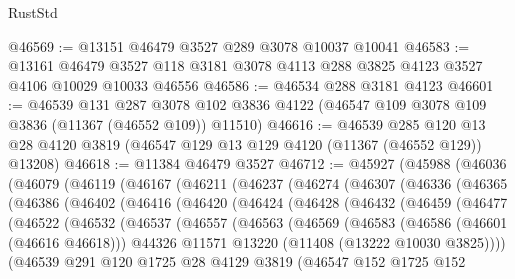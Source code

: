 \begin{lexlean}{RustStd}
\begin{coremodule}
@46569 := @13151 @46479 @3527 @289 @3078 @10037 @10041
@46583 := @13161
    @46479
    @3527
    @118
    @3181
    @3078
    @4113
    @288
    @3825
    @4123
    @3527
    @4106
    @10029
    @10033
    @46556
@46586 := @46534 @288 @3181 @4123
@46601 := @46539
    @131
    @287
    @3078
    @102
    @3836
    @4122
    (@46547 @109 @3078 @109 @3836 (@11367 (@46552 @109)) @11510)
@46616 := @46539
    @285
    @120
    @13
    @28
    @4120
    @3819
    (@46547 @129 @13 @129 @4120 (@11367 (@46552 @129)) @13208)
@46618 := @11384 @46479 @3527
@46712 := @45927
    (@45988
      (@46036
        (@46079
          (@46119
            (@46167
              (@46211
                (@46237
                  (@46274
                    (@46307
                      (@46336
                        (@46365
                          (@46386
                            (@46402
                              (@46416
                                (@46420
                                  (@46424
                                    (@46428
                                      (@46432
                                        (@46459
                                          (@46477
                                            (@46522
                                              (@46532
                                                (@46537
                                                  (@46557
                                                    (@46563
                                                      (@46569
                                                        (@46583
                                                          (@46586 (@46601 (@46616 @46618)))
                                                          @44326
                                                          @11571
                                                          @13220
                                                          (@11408 (@13222 @10030 @3825))))
                                                      (@46539
                                                        @291
                                                        @120
                                                        @1725
                                                        @28
                                                        @4129
                                                        @3819
                                                        (@46547
                                                          @152
                                                          @1725
                                                          @152

\end{coremodule}
\end{lexlean}
